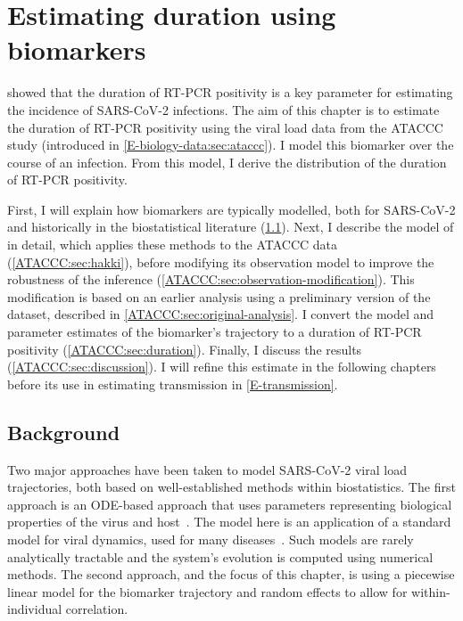 \documentclass[thesis.tex]{subfiles}
\begin{document}
\ifSubfilesClassLoaded{
  \setcounter{chapter}{3}
}

\chapter{Estimating duration using biomarkers} \label{ATACCC}

 showed that the duration of RT-PCR positivity is a key parameter for estimating the incidence of SARS-CoV-2 infections.
The aim of this chapter is to estimate the duration of RT-PCR positivity using the viral load data from the ATACCC study (introduced in \cref{E-biology-data:sec:ataccc}).
I model this biomarker over the course of an infection.
From this model, I derive the distribution of the duration of RT-PCR positivity.

First, I will explain how biomarkers are typically modelled, both for SARS-CoV-2 and historically in the biostatistical literature (\cref{ATACCC:sec:background}).
Next, I describe the model of \textcite{hakkiOnset} in detail, which applies these methods to the ATACCC data (\cref{ATACCC:sec:hakki}), before modifying its observation model to improve the robustness of the inference (\cref{ATACCC:sec:observation-modification}).
This modification is based on an earlier analysis using a preliminary version of the dataset, described in \cref{ATACCC:sec:original-analysis}.
I convert the model and parameter estimates of the biomarker's trajectory to a duration of RT-PCR positivity (\cref{ATACCC:sec:duration}).
Finally, I discuss the results (\cref{ATACCC:sec:discussion}).
I will refine this estimate in the following chapters before its use in estimating transmission in \cref{E-transmission}.

\section{Background} \label{ATACCC:sec:background}

Two major approaches have been taken to model SARS-CoV-2 viral load trajectories, both based on well-established methods within biostatistics.
The first approach is an ODE-based approach that uses parameters representing biological properties of the virus and host~\autocite[e.g.][]{ejimaEstimation,keVivo,kimQuantitative,goncalvesTiming,perelsonMechanistic}.
The model here is an application of a standard model for viral dynamics, used for many diseases~\autocite{perelsonMechanistic,hernandez-vargasInhost}.
Such models are rarely analytically tractable and the system's evolution is computed using numerical methods.
The second approach, and the focus of this chapter, is using a piecewise linear model for the biomarker trajectory and random effects to allow for within-individual correlation.
\end{document}
